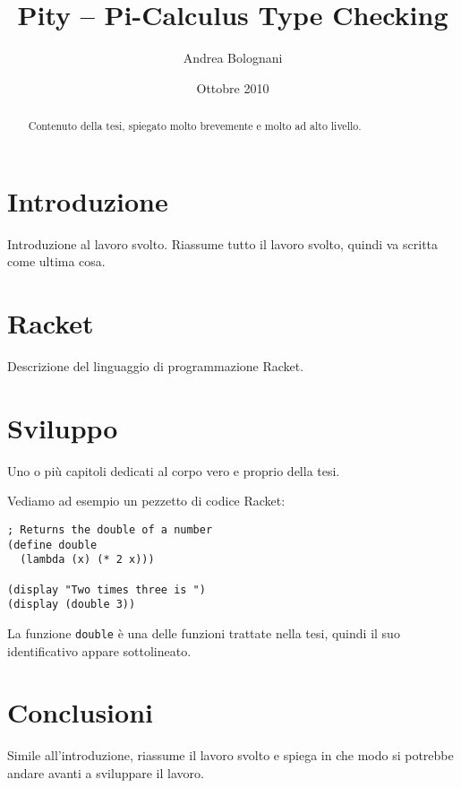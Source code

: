 \documentclass[a4paper]{article}
\begin{document}
\title{Pity -- Pi-Calculus Type Checking}
\author{Andrea Bolognani}
\date{Ottobre 2010}

\maketitle


\begin{abstract}
Contenuto della tesi, spiegato molto brevemente e molto ad alto livello.
\end{abstract}


\clearpage

\tableofcontents

\clearpage


\section{Introduzione}

Introduzione al lavoro svolto. Riassume tutto il lavoro svolto, quindi
va scritta come ultima cosa.





\section{Racket}

Descrizione del linguaggio di programmazione Racket.


\section{Sviluppo}

Uno o pi\`u capitoli dedicati al corpo vero e proprio della tesi.

Vediamo ad esempio un pezzetto di codice Racket:

\begin{lstlisting}
; Returns the double of a number
(define double
  (lambda (x) (* 2 x)))

(display "Two times three is ")
(display (double 3))
\end{lstlisting}

La funzione \lstinline{double} \`e una delle funzioni trattate nella tesi,
quindi il suo identificativo appare sottolineato.


\section{Conclusioni}

Simile all'introduzione, riassume il lavoro svolto e spiega in che
modo si potrebbe andare avanti a sviluppare il lavoro.
\end{document}
